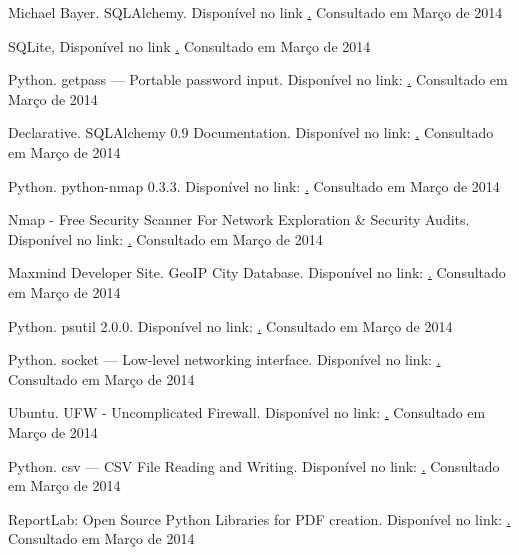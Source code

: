 \documentclass[10pt,journal,cspaper,compsoc]{IEEEtran}
\begin{document}
\begin{thebibliography}{30}

Michael Bayer. SQLAlchemy. Disponível no link \href{http://www.sqlalchemy.org}. Consultado em Março de 2014


SQLite, Disponível  no link \href{https://www.sqlite.org}. Consultado em Março de 2014 

Python. getpass — Portable password input. Disponível no link: \href{http://docs.python.org/2/library/getpass.html}. Consultado em Março de 2014

Declarative. SQLAlchemy 0.9 Documentation. Disponível no link: \href{http://docs.sqlalchemy.org/en/rel\_0\_9/orm/extensions/
declarative.html}. Consultado em Março de 2014

Python. python-nmap 0.3.3. Disponível no link: \href{https://pypi.python.org/pypi/python-nmap/0.3.3}. Consultado em Março de 2014

Nmap - Free Security Scanner For Network Exploration \& Security Audits. Disponível no link: \href{http://nmap.org/}. Consultado em Março de 2014

Maxmind Developer Site. GeoIP City Database. Disponível no link: \href{http://dev.maxmind.com/geoip/legacy/install/city/}. Consultado em Março de 2014

Python. psutil 2.0.0. Disponível no link: \href{https://pypi.python.org/pypi/psutil/}. Consultado em Março de 2014

Python. socket — Low-level networking interface. Disponível no link: \href{http://docs.python.org/2/library/socket.html}. Consultado em Março de 2014

Ubuntu. UFW - Uncomplicated Firewall. Disponível no link: \href{https://help.ubuntu.com/community/UFW}. Consultado em Março de 2014

Python. csv — CSV File Reading and Writing. Disponível no link: \href{http://docs.python.org/2/library/csv.html}. Consultado em Março de 2014

ReportLab: Open Source Python Libraries for PDF creation. Disponível no link: \href{http://www.reportlab.com/software/opensource/}. Consultado em Março de 2014


\end{thebibliography}
\end{document}
